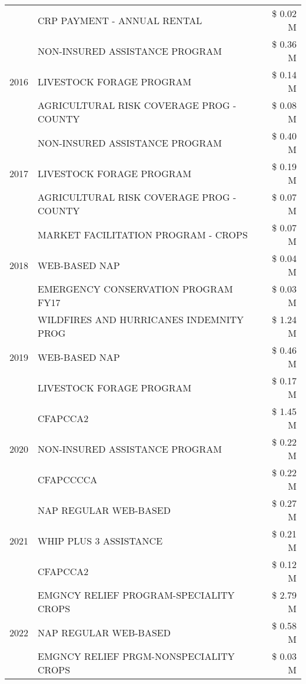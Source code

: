\begin{tabular}{llr}
 & CRP PAYMENT - ANNUAL RENTAL & \$ 0.02 M \\
\cline{1-3}
\multirow[t]{3}{*}{2016} & NON-INSURED ASSISTANCE PROGRAM & \$ 0.36 M \\
 & LIVESTOCK FORAGE PROGRAM & \$ 0.14 M \\
 & AGRICULTURAL RISK COVERAGE PROG - COUNTY & \$ 0.08 M \\
\cline{1-3}
\multirow[t]{3}{*}{2017} & NON-INSURED ASSISTANCE PROGRAM & \$ 0.40 M \\
 & LIVESTOCK FORAGE PROGRAM & \$ 0.19 M \\
 & AGRICULTURAL RISK COVERAGE PROG - COUNTY & \$ 0.07 M \\
\cline{1-3}
\multirow[t]{3}{*}{2018} & MARKET FACILITATION PROGRAM - CROPS & \$ 0.07 M \\
 & WEB-BASED NAP & \$ 0.04 M \\
 & EMERGENCY CONSERVATION PROGRAM FY17 & \$ 0.03 M \\
\cline{1-3}
\multirow[t]{3}{*}{2019} & WILDFIRES AND HURRICANES INDEMNITY PROG & \$ 1.24 M \\
 & WEB-BASED NAP & \$ 0.46 M \\
 & LIVESTOCK FORAGE PROGRAM & \$ 0.17 M \\
\cline{1-3}
\multirow[t]{3}{*}{2020} & CFAPCCA2 & \$ 1.45 M \\
 & NON-INSURED ASSISTANCE PROGRAM & \$ 0.22 M \\
 & CFAPCCCCA & \$ 0.22 M \\
\cline{1-3}
\multirow[t]{3}{*}{2021} & NAP REGULAR WEB-BASED & \$ 0.27 M \\
 & WHIP PLUS 3 ASSISTANCE & \$ 0.21 M \\
 & CFAPCCA2 & \$ 0.12 M \\
\cline{1-3}
\multirow[t]{3}{*}{2022} & EMGNCY RELIEF PROGRAM-SPECIALITY CROPS & \$ 2.79 M \\
 & NAP REGULAR WEB-BASED & \$ 0.58 M \\
 & EMGNCY RELIEF PRGM-NONSPECIALITY CROPS & \$ 0.03 M \\
\cline{1-3}
\bottomrule
\end{tabular}
